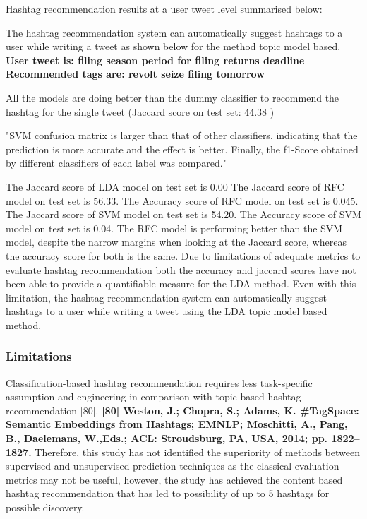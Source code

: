 Hashtag recommendation results at a user tweet level summarised below:

The hashtag recommendation system can automatically suggest hashtags to a user while writing a tweet as shown below for the method topic model based.    \textbf{User tweet is: filing season period for filing returns deadline
Recommended tags are: revolt seize filing tomorrow}

All the models are doing better than the dummy classifier to recommend the hashtag for the single tweet (Jaccard score on test set: 44.38 )

"SVM confusion matrix is larger than that of other classifiers,
indicating that the prediction is more accurate and the effect
is better. Finally, the f1-Score obtained by different classifiers of each label was compared."

The Jaccard score of LDA model on test set is 0.00
The Jaccard score of RFC model on test set is 56.33.
The Accuracy score of RFC model on test set is 0.045.
The Jaccard score of SVM model on test set is 54.20.
The Accuracy score of SVM model on test set is 0.04.
The RFC model is performing better than the SVM model, despite the narrow margins when looking at the Jaccard score, whereas the accuracy score for both is the same.  Due to limitations of adequate metrics to evaluate hashtag recommendation both the accuracy and jaccard scores have not been able to provide a quantifiable measure for the LDA method.  Even with this limitation, the hashtag recommendation system can automatically suggest hashtags to a user while writing a tweet using the LDA topic model based method. 

\subsubsection{Limitations}

Classification-based hashtag recommendation requires less task-specific assumption and engineering in comparison with topic-based hashtag recommendation [80].    \textbf{[80] Weston, J.; Chopra, S.; Adams, K. #TagSpace: Semantic Embeddings from Hashtags; EMNLP; Moschitti, A., Pang, B., Daelemans, W.,Eds.; ACL: Stroudsburg, PA, USA, 2014; pp. 1822–1827.}
Therefore, this study has not identified the superiority of methods between supervised and unsupervised prediction techniques as the classical evaluation metrics may not be useful, however, the study has achieved the  content based hashtag recommendation that has led to possibility of up to 5 hashtags for possible discovery.

